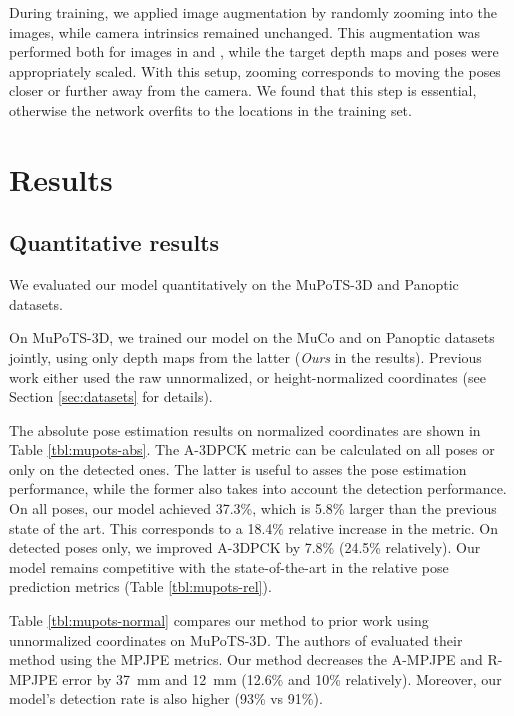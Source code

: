 \documentclass[runningheads]{llncs}
\begin{document}
During training, we applied image augmentation by randomly zooming into the images, while camera intrinsics remained unchanged. This augmentation was performed both for images in  and , while the target depth maps and poses were appropriately scaled. With this setup, zooming corresponds to moving the poses closer or further away from the camera. We found that this step is essential, otherwise the network overfits to the  locations in the training set.

\section{Results}
\subsection{Quantitative results}

We evaluated our model quantitatively on the MuPoTS-3D and Panoptic datasets. 

On MuPoTS-3D, we trained our model on the MuCo and on Panoptic datasets jointly, using only depth maps from the latter (\emph{Ours} in the results). Previous work either used the raw unnormalized, or height-normalized coordinates (see Section \ref{sec:datasets} for details). 

The absolute pose estimation results on normalized coordinates are shown in Table \ref{tbl:mupots-abs}. The A\nobreakdash-3DPCK metric can be calculated on all poses or only on the detected ones. The latter is useful to asses the pose estimation performance, while the former also takes into account the detection performance. On all poses, our model achieved 37.3\%, which is 5.8\% larger than the previous state of the art. This corresponds to a 18.4\% relative increase in the metric. On detected poses only, we improved  A\nobreakdash-3DPCK by 7.8\% (24.5\% relatively). Our model remains competitive with the state-of-the-art in the relative pose prediction metrics (Table \ref{tbl:mupots-rel}).

Table \ref{tbl:mupots-normal} compares our method to prior work using unnormalized coordinates on MuPoTS-3D. The authors of \cite{veges2019depthpose} evaluated their method using the MPJPE metrics. Our method decreases the A-MPJPE and R-MPJPE error by 37~mm and 12~mm (12.6\% and 10\% relatively). Moreover, our model's detection rate is also higher (93\% vs 91\%).
\end{document}

